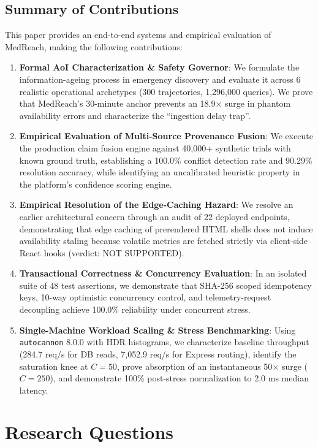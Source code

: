\documentclass[conference]{IEEEtran}
\begin{document}
\subsection{Summary of Contributions}
This paper provides an end-to-end systems and empirical evaluation of MedReach, making the following contributions:
\begin{enumerate}
    \item \textbf{Formal AoI Characterization \& Safety Governor}: We formulate the information-ageing process in emergency discovery and evaluate it across 6 realistic operational archetypes (300 trajectories, 1,296,000 queries). We prove that MedReach's 30-minute anchor prevents an 18.9$\times$ surge in phantom availability errors and characterize the ``ingestion delay trap''.
    \item \textbf{Empirical Evaluation of Multi-Source Provenance Fusion}: We execute the production claim fusion engine against 40,000+ synthetic trials with known ground truth, establishing a 100.0\% conflict detection rate and 90.29\% resolution accuracy, while identifying an uncalibrated heuristic property in the platform's confidence scoring engine.
    \item \textbf{Empirical Resolution of the Edge-Caching Hazard}: We resolve an earlier architectural concern through an audit of 22 deployed endpoints, demonstrating that edge caching of prerendered HTML shells does not induce availability staling because volatile metrics are fetched strictly via client-side React hooks (verdict: NOT SUPPORTED).
    \item \textbf{Transactional Correctness \& Concurrency Evaluation}: In an isolated suite of 48 test assertions, we demonstrate that SHA-256 scoped idempotency keys, 10-way optimistic concurrency control, and telemetry-request decoupling achieve 100.0\% reliability under concurrent stress.
    \item \textbf{Single-Machine Workload Scaling \& Stress Benchmarking}: Using \texttt{autocannon} 8.0.0 with HDR histograms, we characterize baseline throughput (284.7 req/s for DB reads, 7,052.9 req/s for Express routing), identify the saturation knee at $C=50$, prove absorption of an instantaneous 50$\times$ surge ($C=250$), and demonstrate 100\% post-stress normalization to 2.0 ms median latency.
\end{enumerate}

\section{Research Questions}
\end{document}
